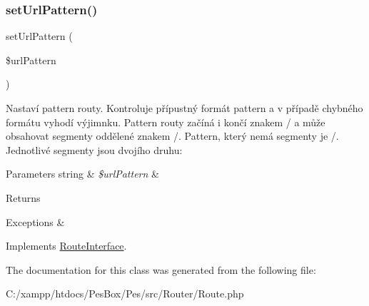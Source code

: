 \mbox{\label{class_pes_1_1_router_1_1_route_af41294828fa9f8f8d45605c7f5046f83}} 
\subsubsection{\texorpdfstring{set\+Url\+Pattern()}{setUrlPattern()}}
{\footnotesize\ttfamily set\+Url\+Pattern (\begin{DoxyParamCaption}\item[{}]{\$url\+Pattern }\end{DoxyParamCaption})}

Nastaví pattern routy. Kontroluje přípustný formát pattern a v případě chybného formátu vyhodí výjimnku. Pattern routy začíná i končí znakem \textquotesingle{}/\textquotesingle{} a může obsahovat segmenty oddělené znakem \textquotesingle{}/\textquotesingle{}. Pattern, který nemá segmenty je \textquotesingle{}/\textquotesingle{}. Jednotlivé segmenty jsou dvojího druhu\+:


\begin{DoxyParams}[1]{Parameters}
string & {\em \$url\+Pattern} & \\
\hline
\end{DoxyParams}
\begin{DoxyReturn}{Returns}

\end{DoxyReturn}

\begin{DoxyExceptions}{Exceptions}
{\em } & \\
\hline
\end{DoxyExceptions}


Implements \mbox{\hyperlink{interface_pes_1_1_router_1_1_route_interface_af41294828fa9f8f8d45605c7f5046f83}{Route\+Interface}}.



The documentation for this class was generated from the following file\+:\begin{DoxyCompactItemize}
\item 
C\+:/xampp/htdocs/\+Pes\+Box/\+Pes/src/\+Router/Route.\+php\end{DoxyCompactItemize}
